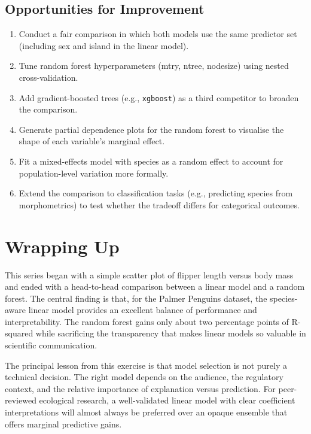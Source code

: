 \documentclass[
  letterpaper,
  DIV=11,
  numbers=noendperiod]{scrartcl}
\providecommand{\tightlist}{%
  \setlength{\itemsep}{0pt}\setlength{\parskip}{0pt}}
\begin{document}
\subsection{Opportunities for
Improvement}\label{opportunities-for-improvement}

\begin{enumerate}
\def\labelenumi{\arabic{enumi}.}
\tightlist
\item
  Conduct a fair comparison in which both models use the same predictor
  set (including sex and island in the linear model).
\item
  Tune random forest hyperparameters (mtry, ntree, nodesize) using
  nested cross-validation.
\item
  Add gradient-boosted trees (e.g., \texttt{xgboost}) as a third
  competitor to broaden the comparison.
\item
  Generate partial dependence plots for the random forest to visualise
  the shape of each variable's marginal effect.
\item
  Fit a mixed-effects model with species as a random effect to account
  for population-level variation more formally.
\item
  Extend the comparison to classification tasks (e.g., predicting
  species from morphometrics) to test whether the tradeoff differs for
  categorical outcomes.
\end{enumerate}

\section{Wrapping Up}\label{wrapping-up}

This series began with a simple scatter plot of flipper length versus
body mass and ended with a head-to-head comparison between a linear
model and a random forest. The central finding is that, for the Palmer
Penguins dataset, the species-aware linear model provides an excellent
balance of performance and interpretability. The random forest gains
only about two percentage points of R-squared while sacrificing the
transparency that makes linear models so valuable in scientific
communication.

The principal lesson from this exercise is that model selection is not
purely a technical decision. The right model depends on the audience,
the regulatory context, and the relative importance of explanation
versus prediction. For peer-reviewed ecological research, a
well-validated linear model with clear coefficient interpretations will
almost always be preferred over an opaque ensemble that offers marginal
predictive gains.
\end{document}
